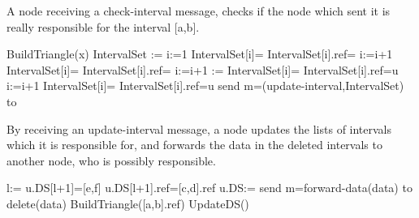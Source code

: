 \documentclass[11pt]{article}
\begin{document}
\begin{algorithm}
A node receiving a check-interval message, checks if the node which sent it is really responsible for the interval [a,b].

\begin{algorithmic}
\If{}
\State BuildTriangle(x)
\EndIf
\State IntervalSet := 
\State i:=1
\If{}
\State IntervalSet[i]= 
\State IntervalSet[i].ref=
\State i:=i+1
\EndIf
\If{}
\State IntervalSet[i]= 
\State IntervalSet[i].ref=
\State i:=i+1
\EndIf
\State           {}
\State [e,f]:=
\If{}
\State IntervalSet[i]= 
\State IntervalSet[i].ref=u
\State i:=i+1
\EndIf
\If{}
\State IntervalSet[i]= 
\State IntervalSet[i].ref=u
\EndIf
\State send m=(update-interval,IntervalSet) to 
\EndFunction
\end{algorithmic}
\end{algorithm}


\begin{algorithm}
By receiving an update-interval message, a node updates the lists of intervals which it is responsible for, and forwards the data in the
deleted intervals to another node, who is possibly responsible.

\begin{algorithmic}
\ForAll {}
\ForAll{}
\ForAll {}
\State l:=
\State u.DS[l+1]=[e,f]
\State u.DS[l+1].ref=[c,d].ref 
\State u.DS:=
\EndFor
\ForAll {}
\State send m=forward-data(data) to   
\State delete(data)
\State BuildTriangle([a,b].ref) 
\EndFor
\EndFor
\EndFor
\State UpdateDS() 
\EndFunction
\end{algorithmic}
\end{algorithm}
\end{document}
